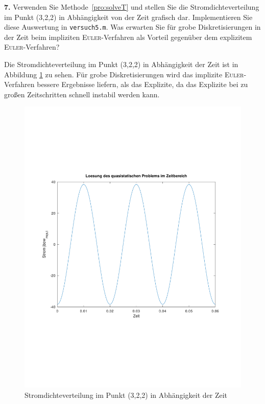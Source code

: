 \documentclass[Protokollheft.tex]{subfiles}
\begin{document}
\begin{framed}
	\noindent \textbf{7.} Verwenden Sie Methode~\eqref{pro:solveT} und stellen Sie die Stromdichteverteilung im Punkt (3,2,2) in Abhängigkeit von der Zeit grafisch dar. Implementieren Sie diese Auswertung in \lstinline{versuch5.m}. Was erwarten Sie für grobe Diskretisierungen in der Zeit beim impliziten \textsc{Euler}-Verfahren als Vorteil gegenüber dem explizitem \textsc{Euler}-Verfahren?\label{exer:currDensityTimeDependent}
\end{framed}
\noindent
Die Stromdichteverteilung im Punkt (3,2,2) in Abhängigkeit der Zeit ist in Abbildung \ref{fig:Stromdichte_punkt} zu sehen. Für grobe Diskretisierungen wird das implizite \textsc{Euler}-Verfahren bessere Ergebnisse liefern, als das Explizite, da das Explizite bei zu großen Zeitschritten schnell instabil werden kann.
\begin{figure}[h]
	\centering
	\includegraphics[trim = 15mm 65mm 15mm 65mm, clip,width=0.7\linewidth]{Stromdichte_punkt.pdf}
	\caption{Stromdichteverteilung im Punkt (3,2,2) in Abhängigkeit der Zeit}
	\label{fig:Stromdichte_punkt}
\end{figure}
\end{document}
